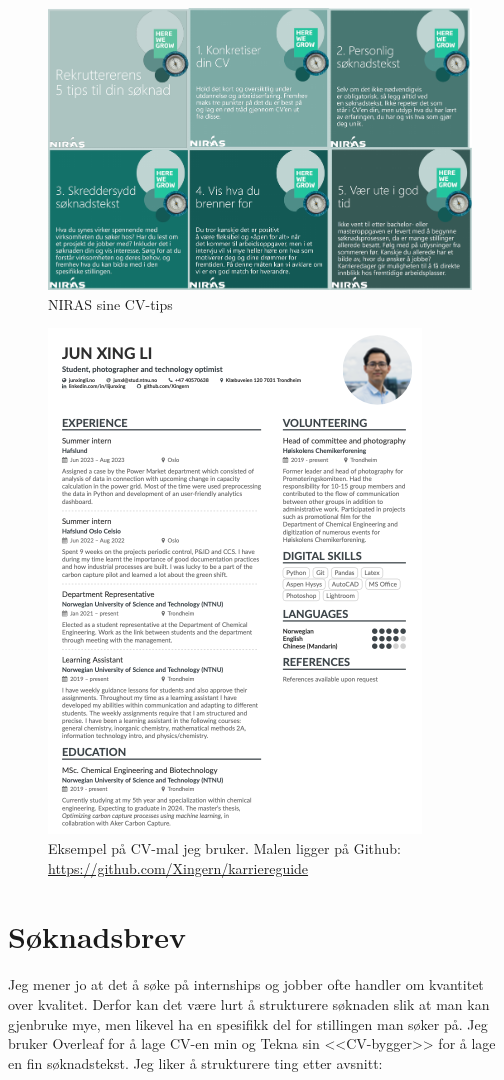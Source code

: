 \begin{figure}[H]
    \centering
    \includegraphics[width=0.8\linewidth]{images/CV-tips.pdf}
    \caption{NIRAS sine CV-tips}
\end{figure}


\begin{figure}[H]
    \centering
    \includegraphics[width=0.5\linewidth]{images/CV-example.png}
    \caption{Eksempel på CV-mal jeg bruker. Malen ligger på Github: \url{https://github.com/Xingern/karriereguide}}
    \label{fig:enter-label}
\end{figure}



\section{Søknadsbrev}

Jeg mener jo at det å søke på internships og jobber ofte handler om kvantitet over kvalitet. Derfor kan det være lurt å strukturere søknaden slik at man kan gjenbruke mye, men likevel ha en spesifikk del for stillingen man søker på. Jeg bruker Overleaf for å lage CV-en min og Tekna sin <<CV-bygger>> for å lage en fin søknadstekst. Jeg liker å strukturere ting etter avsnitt:

